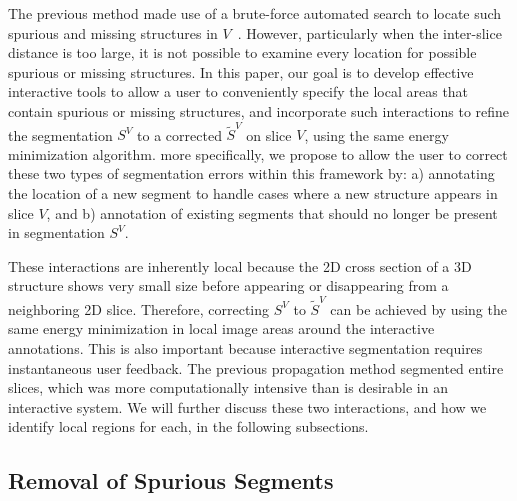 \documentclass[]{spie}  %
\begin{document}
The previous method made use of a brute-force automated search to
locate such spurious and missing structures in $V$~\cite{waggoner:11}.
However, particularly when the inter-slice distance is too large, it
is not possible to examine every location for possible spurious or
missing structures.  In this paper, our goal is to develop effective
interactive tools to allow a user to conveniently specify the local
areas that contain spurious or missing structures, and incorporate
such interactions to refine the segmentation $S^V$ to a corrected
$\tilde{S}^V$ on slice $V$, using the same energy minimization
algorithm.  more specifically, we propose to allow the user to correct
these two types of segmentation errors within this framework by: a)
annotating the location of a new segment to handle cases where a new
structure appears in slice $V$, and b) annotation of existing segments
that should no longer be present in segmentation $S^V$.

These interactions are inherently local because the 2D cross section
of a 3D structure shows very small size before appearing or
disappearing from a neighboring 2D slice.  Therefore, correcting $S^V$
to $\tilde{S}^V$ can be achieved by using the same energy minimization
in local image areas around the interactive annotations.  This is also
important because interactive segmentation requires instantaneous user
feedback.  The previous propagation method segmented entire slices,
which was more computationally intensive than is desirable in an
interactive system.  We will further discuss these two interactions,
and how we identify local regions for each, in the following
subsections.

\subsection{Removal of Spurious Segments}
\label{sec:remove}
\end{document}
